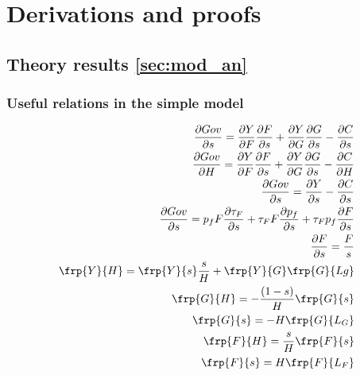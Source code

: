 \clearpage
\appendix
\section{Derivations and proofs}\label{app:derivations}

\subsection{Theory results \ref{sec:mod_an}}
\subsubsection{Useful relations in the simple model}\label{app:dervs_use}
\begin{align*}
\frac{\partial Gov}{\partial s}=\frac{\partial Y}{\partial F}\frac{\partial F}{\partial s}+\frac{\partial Y}{\partial G}\frac{\partial G}{\partial s}-\frac{\partial C}{\partial s}\\
\frac{\partial Gov}{\partial H}=\frac{\partial Y}{\partial F}\frac{\partial F}{\partial s}+\frac{\partial Y}{\partial G}\frac{\partial G}{\partial s}-\frac{\partial C}{\partial H}\\
\frac{\partial Gov}{\partial s}=\frac{\partial Y}{\partial s}-\frac{\partial C}{\partial s}\\
\frac{\partial Gov}{\partial s}=p_f F \frac{\partial \tau_F}{\partial s}+\tau_F F \frac{\partial p_f}{\partial s}+\tau_F p_f \frac{\partial F}{\partial s}\\
\frac{\partial F}{\partial s}=\frac{F}{s}
\\
\frp{Y}{H}= \frp{Y}{s}\frac{s}{H}+\frp{Y}{G}\frp{G}{Lg}
\\
\frp{G}{H}=-\frac{(1-s)}{H}\frp{G}{s}
\\\frp{G}{s}=-H\frp{G}{L_G}\\
\frp{F}{H}=\frac{s}{H}\frp{F}{s}\\
\frp{F}{s}=H\frp{F}{L_F}
\end{align*}

